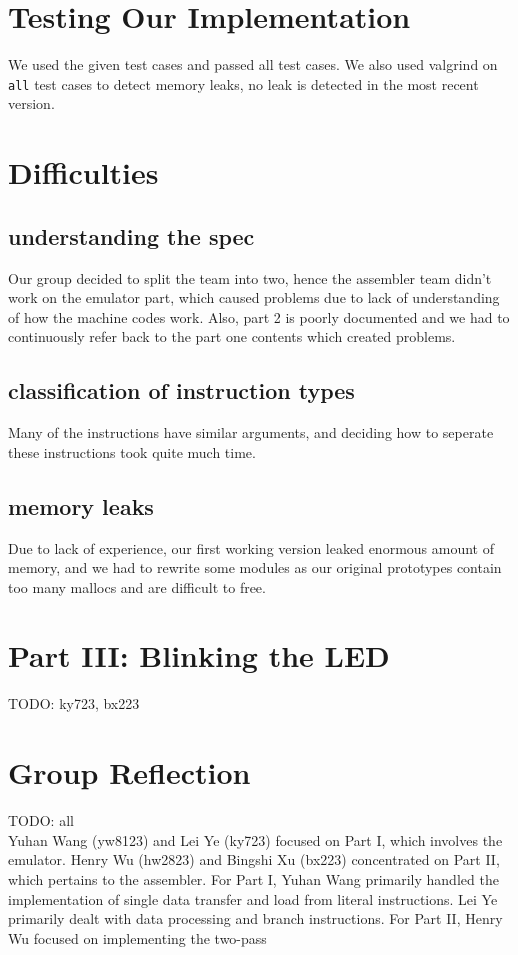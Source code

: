 \documentclass[11pt]{article}
\begin{document}
\section{Testing Our Implementation}

We used the given test cases and passed all test cases. We also used valgrind
on \texttt{all} test cases to detect memory leaks, no leak is detected in the
most recent version.

\section{Difficulties}
\subsection{understanding the spec}
Our group decided to split the team into two, hence the assembler team didn't
work on the emulator part, which caused problems due to lack of understanding
of how the machine codes work. Also, part 2 is poorly documented and we had to
continuously refer back to the part one contents which created problems.
\subsection{classification of instruction types}
Many of the instructions have similar arguments, and deciding how to seperate
these instructions took quite much time.
\subsection{memory leaks}
Due to lack of experience, our first working version leaked enormous amount of
memory, and we had to rewrite some modules as our original prototypes contain
too many mallocs and are difficult to free.

\section{Part III: Blinking the LED}
TODO: ky723, bx223

\section{Group Reflection}

TODO: all\\ Yuhan Wang (yw8123) and Lei Ye (ky723) focused on Part I, which
involves the emulator. Henry Wu (hw2823) and Bingshi Xu (bx223) concentrated on
Part II, which pertains to the assembler. For Part I, Yuhan Wang primarily
handled the implementation of single data transfer and load from literal
instructions. Lei Ye primarily dealt with data processing and branch
instructions. For Part II, Henry Wu focused on implementing the two-pass
\end{document}
